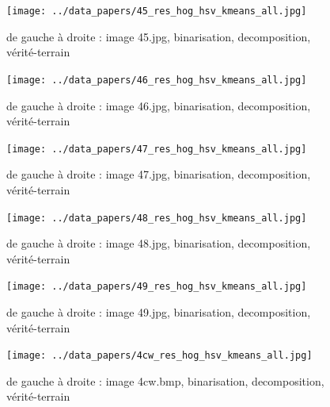 \documentclass{book}
\begin{document}
\begin{figure}[H]
\begin{center}
\texttt{[image: ../data\_papers/45\_res\_hog\_hsv\_kmeans\_all.jpg]}
\end{center}
\caption{de gauche à droite : image 45.jpg, binarisation, decomposition, vérité-terrain}
\label{45}
\end{figure}
\clearpage


\begin{figure}[H]
\begin{center}
\texttt{[image: ../data\_papers/46\_res\_hog\_hsv\_kmeans\_all.jpg]}
\end{center}
\caption{de gauche à droite : image 46.jpg, binarisation, decomposition, vérité-terrain}
\label{46}
\end{figure}
\clearpage


\begin{figure}[H]
\begin{center}
\texttt{[image: ../data\_papers/47\_res\_hog\_hsv\_kmeans\_all.jpg]}
\end{center}
\caption{de gauche à droite : image 47.jpg, binarisation, decomposition, vérité-terrain}
\label{47}
\end{figure}
\clearpage


\begin{figure}[H]
\begin{center}
\texttt{[image: ../data\_papers/48\_res\_hog\_hsv\_kmeans\_all.jpg]}
\end{center}
\caption{de gauche à droite : image 48.jpg, binarisation, decomposition, vérité-terrain}
\label{48}
\end{figure}
\clearpage


\begin{figure}[H]
\begin{center}
\texttt{[image: ../data\_papers/49\_res\_hog\_hsv\_kmeans\_all.jpg]}
\end{center}
\caption{de gauche à droite : image 49.jpg, binarisation, decomposition, vérité-terrain}
\label{49}
\end{figure}
\clearpage


\begin{figure}[H]
\begin{center}
\texttt{[image: ../data\_papers/4cw\_res\_hog\_hsv\_kmeans\_all.jpg]}
\end{center}
\caption{de gauche à droite : image 4cw.bmp, binarisation, decomposition, vérité-terrain}
\label{4cw}
\end{figure}
\clearpage
\end{document}
